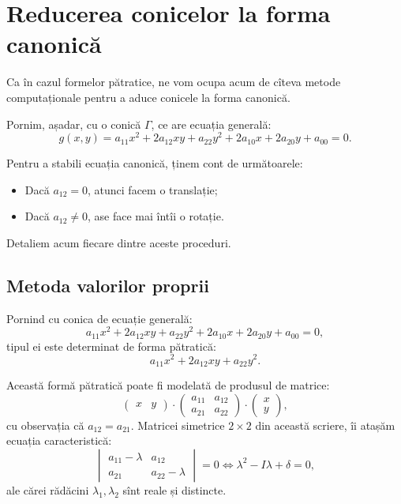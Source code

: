 \documentclass[11pt,a4paper]{article}
\theoremstyle{dotless}
\theoremstyle{dotlessdr}
\begin{document}

\section{Reducerea conicelor la forma canonică}

\indent\indent Ca în cazul formelor pătratice, ne vom ocupa acum de cîteva 
metode computaționale pentru a aduce conicele la forma canonică.

Pornim, așadar, cu o conică $\Gamma$, ce are ecuația generală: 
 \[
	g(x, y) = a_{11} x^2 + 2a_{12} xy + a_{22} y^2 + 2a_{10} x + 2a_{20} y +
	            a_{00} = 0.
\]

Pentru a stabili ecuația canonică, ținem cont de următoarele:
\begin{itemize}
	\item Dacă $a_{12} = 0$, atunci facem o translație;
	\item Dacă $a_{12} \neq 0$, ase face mai întîi o rotație.
\end{itemize}

Detaliem acum fiecare dintre aceste proceduri.


\subsection{Metoda valorilor proprii}

Pornind cu conica de ecuație generală: 
 \[
    a_{11} x^2 + 2a_{12} xy + a_{22} y^2 + 2a_{10} x + 2a_{20} y + a_{00} = 0,
\]
tipul ei este determinat de forma pătratică: 
 \[
	a_{11} x^2 + 2a_{12}xy + a_{22} y^2.
\]

Această formă pătratică poate fi modelată de produsul de matrice: 
 \[
	\begin{pmatrix}
	    x & y
    \end{pmatrix} \cdot \begin{pmatrix}
	                        a_{11} & a_{12} \\
	                        a_{21} & a_{22}
                        \end{pmatrix} \cdot \begin{pmatrix}
	                                            x \\
	                                            y
                                            \end{pmatrix},
\]
cu observația că $a_{12} = a_{21}$. Matricei simetrice $2 \times 2$ din această
scriere, îi atașăm ecuația caracteristică: 
 \[
	\begin{vmatrix}
	    a_{11} - \lambda & a_{12} \\
	    a_{21} & a_{22} - \lambda
    \end{vmatrix} = 0 \Longleftrightarrow \lambda^2 - I \lambda + \delta = 0,
\]
ale cărei rădăcini $\lambda_1, \lambda_2$ sînt reale și distincte.
\end{document}
